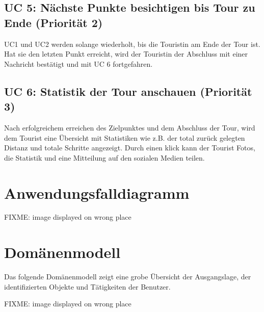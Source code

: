 \documentclass[a4paper,10pt,xetex]{article}
\begin{document}
\subsection{UC 5: Nächste Punkte besichtigen bis Tour zu Ende (Priorität 2)}\label{uc-5-user-besucht-nuxe4chste-punkte-bis-tour-zu-ende.-priorituxe4t-2}
UC1 und UC2 werden solange wiederholt, bis die Touristin am Ende der Tour
ist. Hat sie den letzten Punkt erreicht, wird der Touristin der Abschluss
mit einer Nachricht bestätigt und mit UC 6 fortgefahren.


\subsection{UC 6: Statistik der Tour anschauen (Priorität 3)}\label{uc-6-user-sieht-statistik-der-tour.-priorituxe4t-3}
Nach erfolgreichem erreichen des Zielpunktes und dem Abschluss der Tour,
wird dem Tourist eine Übersicht mit Statistiken wie z.B. der total
zurück gelegten Distanz und totale Schritte angezeigt. Durch einen klick
kann der Tourist Fotos, die Statistik und eine Mitteilung auf den
sozialen Medien teilen.


\section{Anwendungsfalldiagramm}\label{anwendungsfalldiagramm}
FIXME: image displayed on wrong place


\section{Domänenmodell}\label{domaenenmodell}
Das folgende Domänenmodell zeigt eine grobe Übersicht der Ausgangslage,
der identifizierten Objekte und Tätigkeiten der Benutzer.

FIXME: image displayed on wrong place

\end{document}
